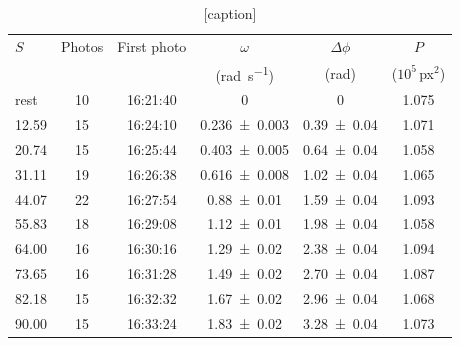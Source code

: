 \begin{table}[tb]
  \centering\small\setlength{\tabcolsep}{3.5pt}
  \begin{tabular}{lccccc}
    \toprule
    $S$ & Photos & First photo & $\omega$ & $\Delta\phi$ & $P$ \\
        &        &             & (\unit{\radian\per\second}) & (\unit{\radian}) & ($10^5$\,px$^2$) \\
    \midrule
    rest & 10 & 16:21:40 & 0 & 0 & \num{1.075}\\
    12.59 & 15 & 16:24:10 & \num{0.236\pm0.003} & \num{0.39\pm0.04} & \num{1.071}\\
    20.74 & 15 & 16:25:44 & \num{0.403\pm0.005} & \num{0.64\pm0.04} & \num{1.058}\\
    31.11 & 19 & 16:26:38 & \num{0.616\pm0.008} & \num{1.02\pm0.04} & \num{1.065}\\
    44.07 & 22 & 16:27:54 & \num{0.88\pm0.01} & \num{1.59\pm0.04} & \num{1.093}\\
    55.83 & 18 & 16:29:08 & \num{1.12\pm0.01} & \num{1.98\pm0.04} & \num{1.058}\\
    64.00 & 16 & 16:30:16 & \num{1.29\pm0.02} & \num{2.38\pm0.04} & \num{1.094}\\
    73.65 & 16 & 16:31:28 & \num{1.49\pm0.02} & \num{2.70\pm0.04} & \num{1.087}\\
    82.18 & 15 & 16:32:32 & \num{1.67\pm0.02} & \num{2.96\pm0.04} & \num{1.068}\\
    90.00 & 15 & 16:33:24 & \num{1.83\pm0.02} & \num{3.28\pm0.04} & \num{1.073}\\
    \bottomrule
  \end{tabular}
  \caption{[caption]%
  }
  \label{tab:settings}
\end{table}


